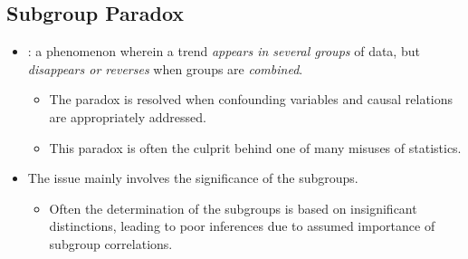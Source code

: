 \begin{itemize}
  \subsection{Subgroup Paradox}
  \begin{itemize}
    \item {}: a phenomenon wherein a trend \emph{appears in several groups} of data, but \emph{disappears or reverses} when groups are \emph{combined}.
      \begin{itemize}
        \item The paradox is resolved when confounding variables and causal relations are appropriately addressed.
        \item This paradox is often the culprit behind one of many misuses of statistics. 
      \end{itemize}
    \item The issue mainly involves the significance of the subgroups.
      \begin{itemize}
        \item Often the determination of the subgroups is based on insignificant distinctions, leading to poor inferences due to assumed importance of subgroup correlations.
      \end{itemize}
  \end{itemize}
  
\end{itemize}
